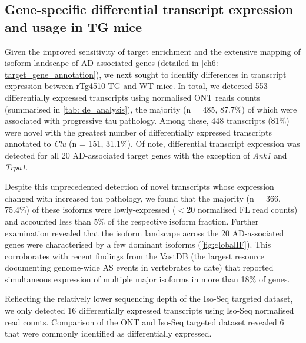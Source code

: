 \newpage
\subsection{Gene-specific differential transcript expression and usage in TG mice}
Given the improved sensitivity of target enrichment and the extensive mapping of isoform landscape of AD-associated genes (detailed in \cref{ch6: target_gene_annotation}), we next sought to identify differences in transcript expression between rTg4510 TG and WT mice. In total, we detected 553 differentially expressed transcripts using normalised ONT reads counts (summarised in \cref{tab: de_analysis}), the majority (n = 485, 87.7\%) of which were associated with progressive tau pathology. Among these, 448 transcripts (81\%) were novel with the greatest number of differentially expressed transcripts annotated to \textit{Clu} (n = 151, 31.1\%). Of note, differential transcript expression was detected for all 20 AD-associated target genes with the exception of \textit{Ank1} and \textit{Trpa1}. 

Despite this unprecedented detection of novel transcripts whose expression changed with increased tau pathology, we found that the majority (n = 366, 75.4\%) of these isoforms were lowly-expressed ($<$20 normalised FL read counts) and accounted less than 5\% of the respective isoform fraction. Further examination revealed that the isoform landscape across the 20 AD-associated genes were characterised by a few dominant isoforms (\cref{fig:globalIF}). This corroborates with recent findings from the VastDB\cite{Tapial2017} (the largest resource documenting genome-wide AS events in vertebrates to date) that reported simultaneous expression of multiple major isoforms in more than 18\% of genes\cite{Tapial2017}. 

Reflecting the relatively lower sequencing depth of the Iso-Seq targeted dataset, we only detected 16 differentially expressed transcripts using Iso-Seq normalised read counts. Comparison of the ONT and Iso-Seq targeted dataset revealed 6 that were commonly identified as differentially expressed. 


